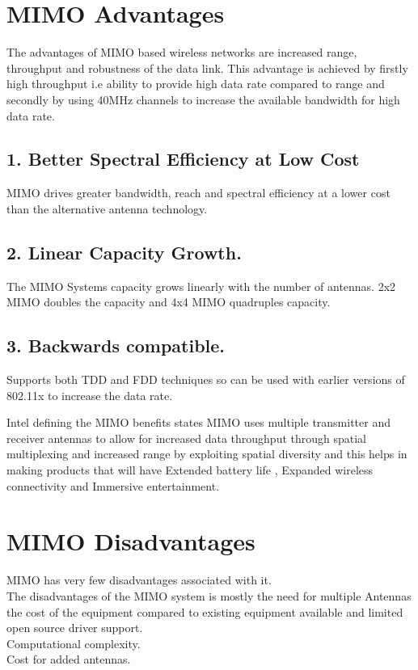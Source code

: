 \documentclass[12pt]{report}
\begin{document}
    
    \section*{MIMO Advantages}
    The advantages of MIMO based wireless networks are increased range,
throughput and robustness of the data link. This advantage is achieved
by firstly high throughput i.e ability to provide high data rate compared
to range and secondly by using 40MHz channels to increase the available
bandwidth for high data rate.

 \subsection*{1. Better Spectral Efficiency at Low Cost}
 MIMO drives greater bandwidth, reach and spectral efficiency at a lower
cost than the alternative antenna technology.

\subsection*{2. Linear Capacity Growth.}
The MIMO Systems capacity grows linearly with the number of antennas. 2x2 MIMO doubles the capacity and 4x4 MIMO quadruples
capacity.

 \subsection*{3. Backwards compatible.}
Supports both TDD and FDD techniques so can be used with earlier
versions of 802.11x to increase the data rate.

Intel defining the MIMO benefits states MIMO uses multiple transmitter and receiver antennas to allow for increased data throughput
through spatial multiplexing and increased range by exploiting spatial
diversity and this helps in making products that will have Extended
battery life , Expanded wireless connectivity and Immersive entertainment.
\section*{MIMO Disadvantages}
MIMO has very few disadvantages associated with it.\\
The disadvantages of the MIMO system is mostly the need for multiple Antennas the cost of the equipment compared to existing equipment available and limited open source driver support.\\
Computational complexity.\\
Cost for added antennas.\\
\end{document}
